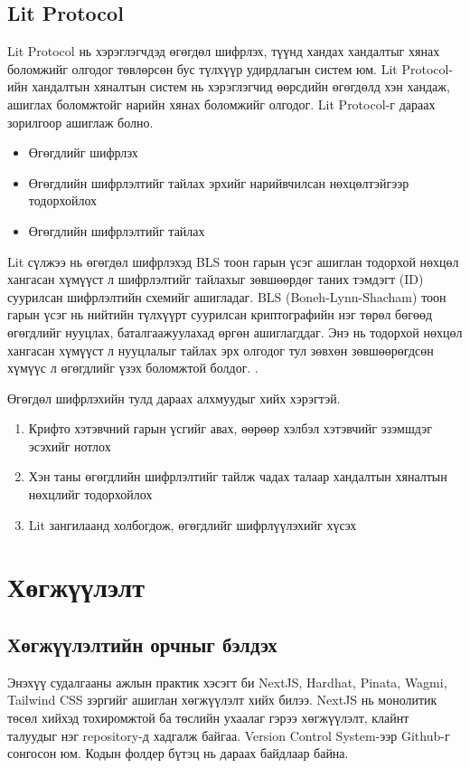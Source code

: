 \subsection{Lit Protocol}
Lit Protocol нь хэрэглэгчдэд өгөгдөл шифрлэх, түүнд хандах хандалтыг хянах боломжийг олгодог төвлөрсөн бус түлхүүр удирдлагын систем юм. Lit Protocol-ийн хандалтын хяналтын систем нь хэрэглэгчид өөрсдийн өгөгдөлд хэн хандаж, ашиглах боломжтойг нарийн хянах боломжийг олгодог.
Lit Protocol-г дараах зорилгоор ашиглаж болно.
\begin{itemize}
   \item Өгөгдлийг шифрлэх
   \item Өгөгдлийн шифрлэлтийг тайлах эрхийг нарийвчилсан нөхцөлтэйгээр тодорхойлох
   \item Өгөгдлийн шифрлэлтийг тайлах
\end{itemize}

Lit сүлжээ нь өгөгдөл шифрлэхэд BLS тоон гарын үсэг ашиглан тодорхой нөхцөл хангасан хүмүүст л шифрлэлтийг тайлахыг зөвшөөрдөг таних тэмдэгт (ID) суурилсан шифрлэлтийн схемийг ашигладаг.
BLS (Boneh-Lynn-Shacham) тоон гарын үсэг нь нийтийн түлхүүрт суурилсан криптографийн нэг төрөл бөгөөд өгөгдлийг нууцлах, баталгаажуулахад өргөн ашиглагддаг. Энэ нь тодорхой нөхцөл хангасан хүмүүст л нууцлалыг тайлах эрх олгодог тул зөвхөн зөвшөөрөгдсөн хүмүүс л өгөгдлийг үзэх боломжтой болдог. .

Өгөгдөл шифрлэхийн тулд дараах алхмуудыг хийх хэрэгтэй.
\begin{enumerate}
   \item Крифто хэтэвчний гарын үсгийг авах, өөрөөр хэлбэл хэтэвчийг эзэмшдэг эсэхийг нотлох
   \item Хэн таны өгөгдлийн шифрлэлтийг тайлж чадах талаар хандалтын хяналтын нөхцлийг тодорхойлох
   \item Lit зангилаанд холбогдож, өгөгдлийг шифрлүүлэхийг хүсэх
\end{enumerate}



\newpage
\section{Хөгжүүлэлт}
\subsection{Хөгжүүлэлтийн орчныг бэлдэх}
Энэхүү судалгааны ажлын практик хэсэгт би NextJS, Hardhat, Pinata, Wagmi, Tailwind CSS зэргийг ашиглан хөгжүүлэлт хийх билээ. NextJS нь монолитик төсөл хийхэд тохиромжтой ба төслийн ухаалаг гэрээ хөгжүүлэлт, клайнт талуудыг нэг repository-д хадгалж байгаа. Version Control System-ээр Github-г сонгосон юм. Кодын фолдер бүтэц нь дараах байдлаар байна.

